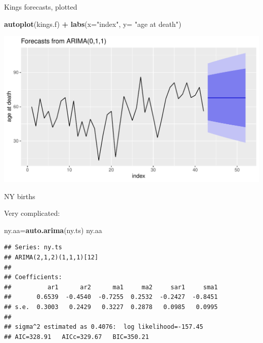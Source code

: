 \documentclass[ignorenonframetext,]{beamer}
\newenvironment{Shaded}{\begin{snugshade}}{\end{snugshade}}
\newcommand{\DataTypeTok}[1]{\textcolor[rgb]{0.13,0.29,0.53}{#1}}
\newcommand{\KeywordTok}[1]{\textcolor[rgb]{0.13,0.29,0.53}{\textbf{#1}}}
\newcommand{\NormalTok}[1]{#1}
\newcommand{\OperatorTok}[1]{\textcolor[rgb]{0.81,0.36,0.00}{\textbf{#1}}}
\newcommand{\StringTok}[1]{\textcolor[rgb]{0.31,0.60,0.02}{#1}}
\begin{document}
\begin{frame}[fragile]{Kings forecasts, plotted}
\protect\hypertarget{kings-forecasts-plotted}{}

\begin{Shaded}
\begin{Highlighting}[]
\KeywordTok{autoplot}\NormalTok{(kings.f) }\OperatorTok{+}\StringTok{ }\KeywordTok{labs}\NormalTok{(}\DataTypeTok{x=}\StringTok{"index"}\NormalTok{, }\DataTypeTok{y=} \StringTok{"age at death"}\NormalTok{)}
\end{Highlighting}
\end{Shaded}

\includegraphics{figure/unnamed-chunk-569-1.pdf}

\end{frame}

\begin{frame}[fragile]{NY births}
\protect\hypertarget{ny-births}{}

Very complicated:

\small

\begin{Shaded}
\begin{Highlighting}[]
\NormalTok{ny.aa=}\KeywordTok{auto.arima}\NormalTok{(ny.ts)}
\NormalTok{ny.aa}
\end{Highlighting}
\end{Shaded}

\begin{verbatim}
## Series: ny.ts 
## ARIMA(2,1,2)(1,1,1)[12] 
## 
## Coefficients:
##          ar1      ar2      ma1     ma2     sar1     sma1
##       0.6539  -0.4540  -0.7255  0.2532  -0.2427  -0.8451
## s.e.  0.3003   0.2429   0.3227  0.2878   0.0985   0.0995
## 
## sigma^2 estimated as 0.4076:  log likelihood=-157.45
## AIC=328.91   AICc=329.67   BIC=350.21
\end{verbatim}

\normalsize

\end{frame}
\end{document}
